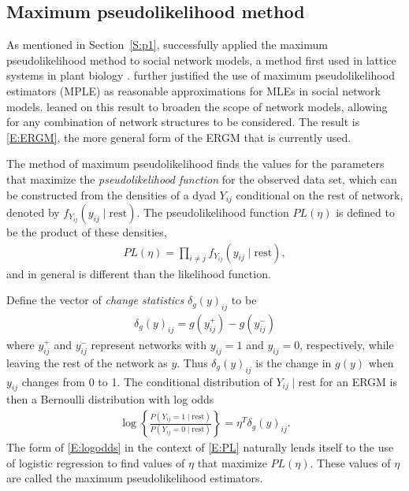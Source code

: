 \subsection{Maximum pseudolikelihood method} \label{S:pseudolikelihood}
As mentioned in Section~\ref{S:p1}, \citet{Frank:1986} successfully applied 
the maximum pseudolikelihood method to social network models, a method first used in lattice systems in plant biology \citep{Besag:1974,Besag:1975}.  \citet{Strauss:1990} further justified the use of 
maximum pseudolikelihood estimators (MPLE) as reasonable approximations for MLEs in 
social network models.  \citet*{Wasserman:1996, Pattison:1999, logit} leaned on this 
result to broaden the scope of network models, allowing 
for any combination of network structures to be considered.  The result is \eqref{E:ERGM},
the more general form of the ERGM that is currently used.

The method of maximum pseudolikelihood finds the values for the parameters that 
maximize the \textit{pseudolikelihood function} for the observed 
data set, which can be constructed from the densities of a dyad $Y_{ij}$ 
conditional on the rest of network, denoted by $f_{Y_{ij}}( y_{ij} \mid \textrm{rest})$.
The pseudolikelihood function $PL(\eta)$ is defined to be the product of these densities,
\begin{align}
	PL(\eta) = \prod_{i \neq j}f_{Y_{ij}}( y_{ij} \mid \textrm{rest}), \label{E:PL}
\end{align}
and in general is different than the likelihood function.

Define the vector of \textit{change statistics} $\delta_g(y)_{ij}$ to be
\begin{align*}
	\delta_g(y)_{ij} = g(y_{ij}^+) - g(y_{ij}^-)
\end{align*}
where $y_{ij}^+$ and $y_{ij}^-$ represent networks with $y_{ij} = 1$ and $y_{ij} = 0$, 
respectively, while leaving the rest of the network as $y$.  Thus $\delta_g(y)_{ij}$ 
is the change in $g(y)$ when $y_{ij}$ changes from 0 to 1.
The conditional distribution of $Y_{ij} \mid \textrm{rest}$ for an ERGM is then a Bernoulli 
distribution with log odds
\begin{align}
	\log \left \{ \frac{P( Y_{ij} =1 \mid \textrm{rest} ) }
				 	 { P( Y_{ij} =0 \mid \textrm{rest} ) } \right \} 
					 			= \eta^T \delta_g(y)_{ij}. \label{E:logodds}
\end{align}
The form of \eqref{E:logodds} in the context of \eqref{E:PL} naturally lends
itself to the use of logistic regression to find values of $\eta$ that
maximize $PL(\eta)$.  These values of $\eta$ are called the maximum pseudolikelihood estimators.

